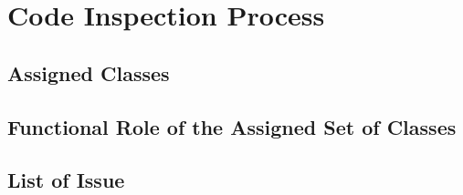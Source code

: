 \section{Code Inspection Process} \label{sec:code-proc}

\subsection{Assigned Classes}

\subsection{Functional Role of the Assigned  Set of Classes}

\subsection{List of Issue}


